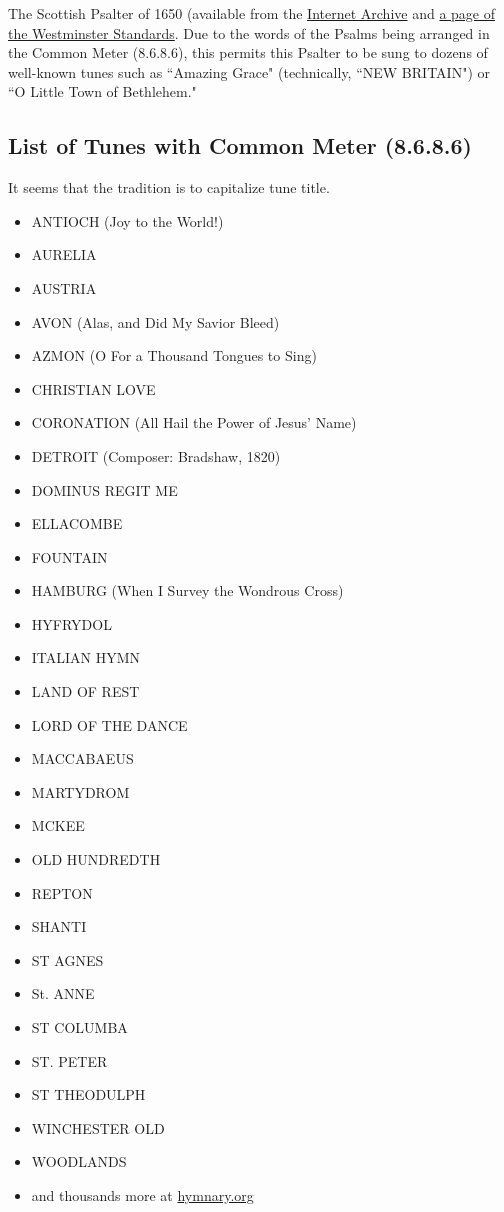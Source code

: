 \documentclass{article}
\begin{document}
The Scottish Psalter of 1650 (available from the \href{https://archive.org/details/scotishpsalter/1650%20PSALTER/}{Internet Archive} and \href{https://thewestminsterstandard.org/1650-scottish-metrical-psalter/}{a page of the Westminster Standards}.  Due to the words of the Psalms being arranged in the Common Meter (8.6.8.6), this permits this Psalter to be sung to dozens of well-known tunes such as ``Amazing Grace" (technically, ``NEW BRITAIN") or ``O Little Town of Bethlehem."

\subsection{List of Tunes with Common Meter (8.6.8.6)}

It seems that the tradition is to capitalize tune title.

\begin{itemize}
	\item ANTIOCH (Joy to the World!)
	\item AURELIA
	\item AUSTRIA
	\item AVON (Alas, and Did My Savior Bleed)
	\item AZMON (O For a Thousand Tongues to Sing)
	\item CHRISTIAN LOVE
	\item CORONATION (All Hail the Power of Jesus' Name)
	\item DETROIT (Composer: Bradshaw, 1820)
	\item DOMINUS REGIT ME
	\item ELLACOMBE
	\item FOUNTAIN
	\item HAMBURG (When I Survey the Wondrous Cross)
	\item HYFRYDOL
	\item ITALIAN HYMN
	\item LAND OF REST
	\item LORD OF THE DANCE
	\item MACCABAEUS
	\item MARTYDROM
	\item MCKEE
	\item OLD HUNDREDTH
	\item REPTON
	\item SHANTI
	\item ST AGNES
	\item St. ANNE
	\item ST COLUMBA
	\item ST. PETER
	\item ST THEODULPH
	\item WINCHESTER OLD
	\item WOODLANDS
	\item and thousands more at \href{https://hymnary.org/search?page=3&qu=meter%3A8.6.8.6%20in%3Atunes&sort=totalInstances}{hymnary.org}
\end{itemize}
\end{document}
